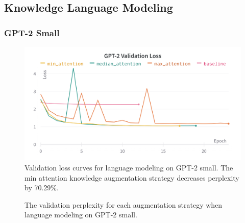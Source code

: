 \documentclass[phd,electronic,oneside,twosidetoc,letterpaper,chaptercenter,parttop,lof]{byumsphd}
\begin{document}
\subsection{Knowledge Language Modeling}

\subsubsection{GPT-2 Small}

\begin{figure}
    \includegraphics[width=\columnwidth]{images/ssm/gpt2-small-val-loss-curves.png}
    \centering
    \caption[GPT-2 small validation loss curves]{
        Validation loss curves for language modeling on GPT-2 small.
        The min attention knowledge augmentation strategy decreases perplexity by 70.29\%.
    }
    \label{fig:gpt2-small-val-loss-curves}
\end{figure}

\begin{figure}
\centering
{}  
    \caption[GPT-2 small validation loss chart]{
        The validation perplexity for each augmentation strategy when language modeling on GPT-2 small.
    }
    \label{fig:gpt2-small-val-loss-chart}
\end{figure}
\end{document}
